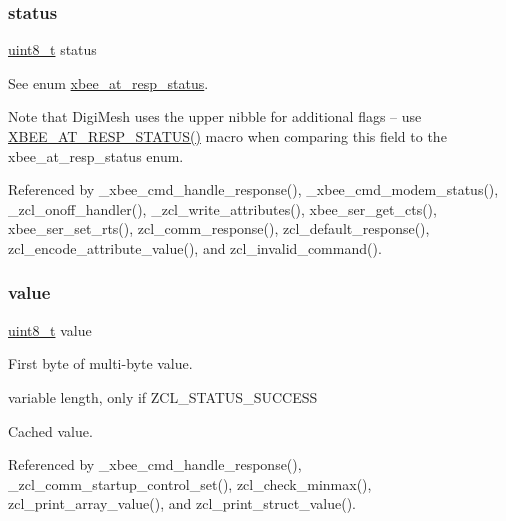 \subsubsection{\texorpdfstring{status}{status}}
{\footnotesize\ttfamily \hyperlink{group__hal__dos_gae1affc9ca37cfb624959c866a73f83c2}{uint8\+\_\+t} status}



See enum \hyperlink{group__xbee__atcmd_gac6a27f1b1ee32b75b6f966afbb347f22}{xbee\+\_\+at\+\_\+resp\+\_\+status}. 

Note that Digi\+Mesh uses the upper nibble for additional flags -- use \hyperlink{group__xbee__atcmd_ga4dc292cd07dfd93bbfb2b8632b580949}{X\+B\+E\+E\+\_\+\+A\+T\+\_\+\+R\+E\+S\+P\+\_\+\+S\+T\+A\+T\+U\+S()} macro when comparing this field to the xbee\+\_\+at\+\_\+resp\+\_\+status enum. 

Referenced by \+\_\+xbee\+\_\+cmd\+\_\+handle\+\_\+response(), \+\_\+xbee\+\_\+cmd\+\_\+modem\+\_\+status(), \+\_\+zcl\+\_\+onoff\+\_\+handler(), \+\_\+zcl\+\_\+write\+\_\+attributes(), xbee\+\_\+ser\+\_\+get\+\_\+cts(), xbee\+\_\+ser\+\_\+set\+\_\+rts(), zcl\+\_\+comm\+\_\+response(), zcl\+\_\+default\+\_\+response(), zcl\+\_\+encode\+\_\+attribute\+\_\+value(), and zcl\+\_\+invalid\+\_\+command().

\mbox{\label{group__xbee__atcmd_ga5bf2410fa8ec37f47f8afeba8dcc7f1b}} 
\subsubsection{\texorpdfstring{value}{value}}
{\footnotesize\ttfamily \hyperlink{group__hal__dos_gae1affc9ca37cfb624959c866a73f83c2}{uint8\+\_\+t} value}



First byte of multi-\/byte value. 

variable length, only if Z\+C\+L\+\_\+\+S\+T\+A\+T\+U\+S\+\_\+\+S\+U\+C\+C\+E\+SS

Cached value. 

Referenced by \+\_\+xbee\+\_\+cmd\+\_\+handle\+\_\+response(), \+\_\+zcl\+\_\+comm\+\_\+startup\+\_\+control\+\_\+set(), zcl\+\_\+check\+\_\+minmax(), zcl\+\_\+print\+\_\+array\+\_\+value(), and zcl\+\_\+print\+\_\+struct\+\_\+value().


